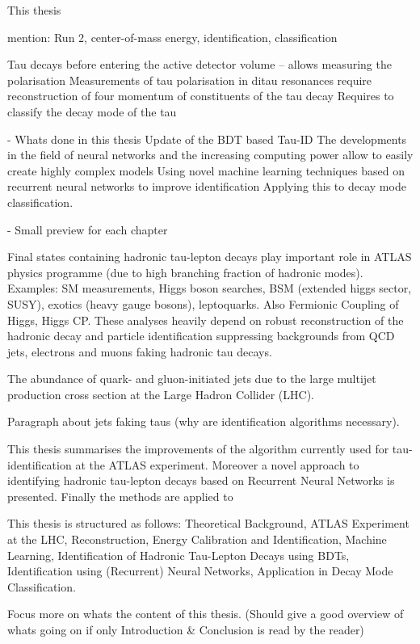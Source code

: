 This thesis

mention: Run 2, center-of-mass energy, identification, classification

Tau decays before entering the active detector volume -- allows measuring the polarisation
Measurements of tau polarisation in ditau resonances require reconstruction of four momentum of constituents of the tau decay
Requires to classify the decay mode of the tau

- Whats done in this thesis
Update of the BDT based Tau-ID
The developments in the field of neural networks and the increasing computing power allow to easily create highly complex models
Using novel machine learning techniques based on recurrent neural networks to improve identification
Applying this to decay mode classification.


- Small preview for each chapter


Final states containing hadronic tau-lepton decays play important role in ATLAS
physics programme (due to high branching fraction of hadronic modes). Examples:
SM measurements, Higgs boson searches, BSM (extended higgs sector, SUSY),
exotics (heavy gauge bosons), leptoquarks. Also Fermionic Coupling of Higgs,
Higgs CP. These analyses heavily depend on robust reconstruction of the hadronic
decay and particle identification suppressing backgrounds from QCD jets,
electrons and muons faking hadronic tau decays.

The abundance of quark- and gluon-initiated jets due to the large multijet
production cross section at the Large Hadron Collider (LHC).

Paragraph about jets faking taus (why are identification algorithms necessary).

This thesis summarises the improvements of the algorithm currently used for
tau-identification at the ATLAS experiment. Moreover a novel approach to
identifying hadronic tau-lepton decays based on Recurrent Neural Networks is
presented. Finally the methods are applied to

This thesis is structured as follows: Theoretical Background, ATLAS Experiment
at the LHC, Reconstruction, Energy Calibration and Identification, Machine
Learning, Identification of Hadronic Tau-Lepton Decays using BDTs,
Identification using (Recurrent) Neural Networks, Application in Decay Mode
Classification.

Focus more on whats the content of this thesis. (Should give a good overview of
whats going on if only Introduction \& Conclusion is read by the reader)


